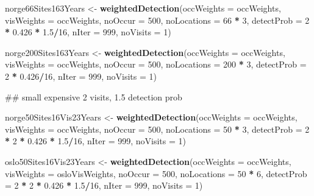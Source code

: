 \documentclass[]{article}
\newenvironment{Shaded}{\begin{snugshade}}{\end{snugshade}}
\newcommand{\KeywordTok}[1]{\textcolor[rgb]{0.13,0.29,0.53}{\textbf{#1}}}
\newcommand{\DataTypeTok}[1]{\textcolor[rgb]{0.13,0.29,0.53}{#1}}
\newcommand{\DecValTok}[1]{\textcolor[rgb]{0.00,0.00,0.81}{#1}}
\newcommand{\FloatTok}[1]{\textcolor[rgb]{0.00,0.00,0.81}{#1}}
\newcommand{\StringTok}[1]{\textcolor[rgb]{0.31,0.60,0.02}{#1}}
\newcommand{\OperatorTok}[1]{\textcolor[rgb]{0.81,0.36,0.00}{\textbf{#1}}}
\newcommand{\NormalTok}[1]{#1}
\begin{document}
\begin{Shaded}
\begin{Highlighting}[]
\NormalTok{norge66Sites163Years <-}\StringTok{ }\KeywordTok{weightedDetection}\NormalTok{(}\DataTypeTok{occWeights =}\NormalTok{ occWeights, }\DataTypeTok{visWeights =}\NormalTok{ occWeights, }
    \DataTypeTok{noOccur =} \DecValTok{500}\NormalTok{, }\DataTypeTok{noLocations =} \DecValTok{66} \OperatorTok{*}\StringTok{ }\DecValTok{3}\NormalTok{, }\DataTypeTok{detectProb =} \DecValTok{2} \OperatorTok{*}\StringTok{ }\FloatTok{0.426} \OperatorTok{*}\StringTok{ }\FloatTok{1.5}\OperatorTok{/}\DecValTok{16}\NormalTok{, }\DataTypeTok{nIter =} \DecValTok{999}\NormalTok{, }
    \DataTypeTok{noVisits =} \DecValTok{1}\NormalTok{)}

\NormalTok{norge200Sites163Years <-}\StringTok{ }\KeywordTok{weightedDetection}\NormalTok{(}\DataTypeTok{occWeights =}\NormalTok{ occWeights, }\DataTypeTok{visWeights =}\NormalTok{ occWeights, }
    \DataTypeTok{noOccur =} \DecValTok{500}\NormalTok{, }\DataTypeTok{noLocations =} \DecValTok{200} \OperatorTok{*}\StringTok{ }\DecValTok{3}\NormalTok{, }\DataTypeTok{detectProb =} \DecValTok{2} \OperatorTok{*}\StringTok{ }\FloatTok{0.426}\OperatorTok{/}\DecValTok{16}\NormalTok{, }\DataTypeTok{nIter =} \DecValTok{999}\NormalTok{, }
    \DataTypeTok{noVisits =} \DecValTok{1}\NormalTok{)}



\NormalTok{## small expensive 2 visits, 1.5 detection prob}

\NormalTok{norge50Sites16Vis23Years <-}\StringTok{ }\KeywordTok{weightedDetection}\NormalTok{(}\DataTypeTok{occWeights =}\NormalTok{ occWeights, }\DataTypeTok{visWeights =}\NormalTok{ occWeights, }
    \DataTypeTok{noOccur =} \DecValTok{500}\NormalTok{, }\DataTypeTok{noLocations =} \DecValTok{50} \OperatorTok{*}\StringTok{ }\DecValTok{3}\NormalTok{, }\DataTypeTok{detectProb =} \DecValTok{2} \OperatorTok{*}\StringTok{ }\DecValTok{2} \OperatorTok{*}\StringTok{ }\FloatTok{0.426} \OperatorTok{*}\StringTok{ }\FloatTok{1.5}\OperatorTok{/}\DecValTok{16}\NormalTok{, }
    \DataTypeTok{nIter =} \DecValTok{999}\NormalTok{, }\DataTypeTok{noVisits =} \DecValTok{1}\NormalTok{)}

\NormalTok{oslo50Sites16Vis23Years <-}\StringTok{ }\KeywordTok{weightedDetection}\NormalTok{(}\DataTypeTok{occWeights =}\NormalTok{ occWeights, }\DataTypeTok{visWeights =}\NormalTok{ osloVisWeights, }
    \DataTypeTok{noOccur =} \DecValTok{500}\NormalTok{, }\DataTypeTok{noLocations =} \DecValTok{50} \OperatorTok{*}\StringTok{ }\DecValTok{6}\NormalTok{, }\DataTypeTok{detectProb =} \DecValTok{2} \OperatorTok{*}\StringTok{ }\DecValTok{2} \OperatorTok{*}\StringTok{ }\FloatTok{0.426} \OperatorTok{*}\StringTok{ }\FloatTok{1.5}\OperatorTok{/}\DecValTok{16}\NormalTok{, }
    \DataTypeTok{nIter =} \DecValTok{999}\NormalTok{, }\DataTypeTok{noVisits =} \DecValTok{1}\NormalTok{)}



\end{Highlighting}
\end{Shaded}
\end{document}
